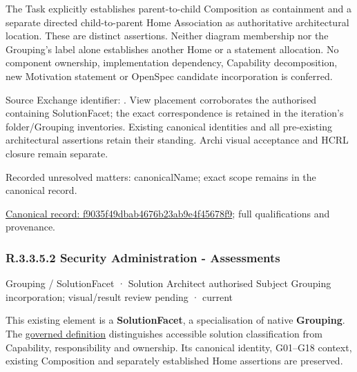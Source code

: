 The Task explicitly establishes parent-to-child Composition as containment and
a separate directed child-to-parent Home Association as authoritative architectural
location. These are distinct assertions. Neither diagram membership nor the
Grouping's label alone establishes another Home or a statement allocation.
No component ownership, implementation dependency, Capability decomposition,
new Motivation statement or OpenSpec candidate incorporation is conferred.



Source Exchange identifier: \texttt{}. View placement corroborates
the authorised containing SolutionFacet; the exact correspondence is retained in the
iteration's folder/Grouping inventories. Existing canonical identities and all
pre-existing architectural assertions retain their standing. Archi visual
acceptance and HCRL closure remain separate.


{\small Recorded unresolved matters: canonicalName; exact scope remains in the canonical record.}\par
{\footnotesize \href{../../../../../../../continuum/grouping/f9035f49dbab4676b23ab9e4f45678f9.md}{Canonical record: f9035f49dbab4676b23ab9e4f45678f9}; full qualifications and provenance.}\par
\subsubsection*{R.3.3.5.2 Security Administration - Assessments}
\label{navigation:R.3.3.5.2}

\label{element:b1997b3f14724bb983c06963fa7b4ea6}
{\small Grouping / SolutionFacet · Solution Architect authorised Subject Grouping incorporation; visual/result review pending · current}\par

This existing element is a \textbf{SolutionFacet}, a specialisation of native
\textbf{Grouping}. The \href{\detokenize{../../../../../../../governance/continuum-representation.md#solutionfacet-classification--1119-candidate}}{governed definition}
distinguishes accessible solution classification from Capability, responsibility
and ownership. Its canonical identity, G01–G18 context, existing Composition
and separately established Home assertions are preserved.




